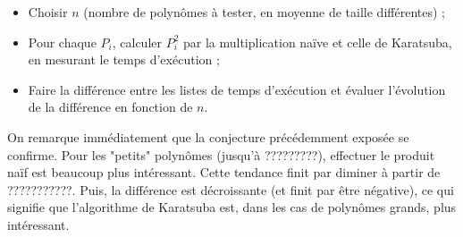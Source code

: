\begin{itemize}
	\item Choisir $n$ (nombre de polynômes à tester, en moyenne de taille différentes) ;
	\item Pour chaque $P_i$, calculer $P_i^2$ par la multiplication naïve et celle de Karatsuba, en mesurant le temps d'exécution ;
	\item Faire la différence entre les listes de temps d'exécution et évaluer l'évolution de la différence en fonction de $n$.
\end{itemize}

On remarque immédiatement que la conjecture précédemment exposée se confirme. Pour les "petits" polynômes (jusqu'à ?????????), effectuer le produit naïf est beaucoup plus intéressant. Cette tendance finit par diminer à partir de ???????????. Puis, la différence est décroissante (et finit par être négative), ce qui signifie que l'algorithme de Karatsuba est, dans les cas de polynômes grands, plus intéressant.
